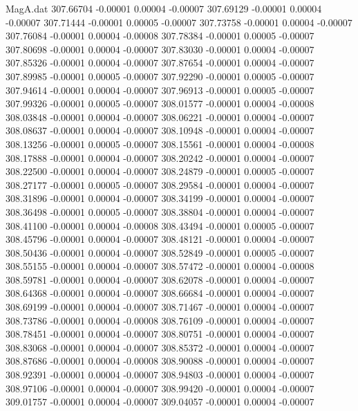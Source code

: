 \begin{filecontents}{MagA.dat}
 307.66704   -0.00001    0.00004   -0.00007
 307.69129   -0.00001    0.00004   -0.00007
 307.71444   -0.00001    0.00005   -0.00007
 307.73758   -0.00001    0.00004   -0.00007
 307.76084   -0.00001    0.00004   -0.00008
 307.78384   -0.00001    0.00005   -0.00007
 307.80698   -0.00001    0.00004   -0.00007
 307.83030   -0.00001    0.00004   -0.00007
 307.85326   -0.00001    0.00004   -0.00007
 307.87654   -0.00001    0.00004   -0.00007
 307.89985   -0.00001    0.00005   -0.00007
 307.92290   -0.00001    0.00005   -0.00007
 307.94614   -0.00001    0.00004   -0.00007
 307.96913   -0.00001    0.00005   -0.00007
 307.99326   -0.00001    0.00005   -0.00007
 308.01577   -0.00001    0.00004   -0.00008
 308.03848   -0.00001    0.00004   -0.00007
 308.06221   -0.00001    0.00004   -0.00007
 308.08637   -0.00001    0.00004   -0.00007
 308.10948   -0.00001    0.00004   -0.00007
 308.13256   -0.00001    0.00005   -0.00007
 308.15561   -0.00001    0.00004   -0.00008
 308.17888   -0.00001    0.00004   -0.00007
 308.20242   -0.00001    0.00004   -0.00007
 308.22500   -0.00001    0.00004   -0.00007
 308.24879   -0.00001    0.00005   -0.00007
 308.27177   -0.00001    0.00005   -0.00007
 308.29584   -0.00001    0.00004   -0.00007
 308.31896   -0.00001    0.00004   -0.00007
 308.34199   -0.00001    0.00004   -0.00007
 308.36498   -0.00001    0.00005   -0.00007
 308.38804   -0.00001    0.00004   -0.00007
 308.41100   -0.00001    0.00004   -0.00008
 308.43494   -0.00001    0.00005   -0.00007
 308.45796   -0.00001    0.00004   -0.00007
 308.48121   -0.00001    0.00004   -0.00007
 308.50436   -0.00001    0.00004   -0.00007
 308.52849   -0.00001    0.00005   -0.00007
 308.55155   -0.00001    0.00004   -0.00007
 308.57472   -0.00001    0.00004   -0.00008
 308.59781   -0.00001    0.00004   -0.00007
 308.62078   -0.00001    0.00004   -0.00007
 308.64368   -0.00001    0.00004   -0.00007
 308.66684   -0.00001    0.00004   -0.00007
 308.69199   -0.00001    0.00004   -0.00007
 308.71467   -0.00001    0.00004   -0.00007
 308.73786   -0.00001    0.00004   -0.00008
 308.76109   -0.00001    0.00004   -0.00007
 308.78451   -0.00001    0.00004   -0.00007
 308.80751   -0.00001    0.00004   -0.00007
 308.83068   -0.00001    0.00004   -0.00007
 308.85372   -0.00001    0.00004   -0.00007
 308.87686   -0.00001    0.00004   -0.00008
 308.90088   -0.00001    0.00004   -0.00007
 308.92391   -0.00001    0.00004   -0.00007
 308.94803   -0.00001    0.00004   -0.00007
 308.97106   -0.00001    0.00004   -0.00007
 308.99420   -0.00001    0.00004   -0.00007
 309.01757   -0.00001    0.00004   -0.00007
 309.04057   -0.00001    0.00004   -0.00007

\end{filecontents}
